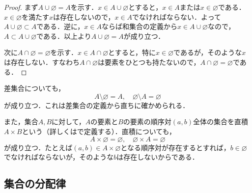 \begin{tleftbar}
  \begin{proof}
    まず$A \cup \varnothing = A$を示す．$x \in A \cup \varnothing$とすると，$x \in A$または$x \in \varnothing$である．$x \in \varnothing$を満たす$x$は存在しないので，$x \in A$でなければならない．よって$A \cup \varnothing \subset A$である．逆に，$x \in A$ならば和集合の定義から$x \in A \cup \varnothing$なので，$A \subset A \cup \varnothing$である．以上より$A \cup \varnothing = A$が成り立つ．

    次に$A \cap \varnothing = \varnothing$を示す．$x \in A \cap \varnothing$とすると，特に$x \in \varnothing$であるが，そのような$x$は存在しない．すなわち$A \cap \varnothing$は要素をひとつも持たないので，$A \cap \varnothing = \varnothing$である．
  \end{proof}
\end{tleftbar}

\begin{remark}[空集合と差集合・直積]
  差集合についても，
  \[
    A \setminus \varnothing = A, \quad \varnothing \setminus A = \varnothing
  \]
  が成り立つ．これは差集合の定義から直ちに確かめられる．

  また，集合$A,B$に対して，$A$の要素と$B$の要素の順序対$(a,b)$全体の集合を直積$A \times B$という（詳しくはで定義する）．直積についても，
  \[
    A \times \varnothing = \varnothing, \quad \varnothing \times A = \varnothing
  \]
  が成り立つ．たとえば$(a, b) \in A \times \varnothing$となる順序対が存在するとすれば，$b \in \varnothing$でなければならないが，そのような$b$は存在しないからである．
\end{remark}

\subsection{集合の分配律}

